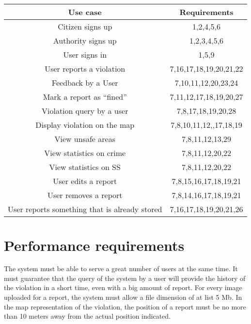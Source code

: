 \documentclass[../RASD.tex]{subfiles}
\begin{document}
    \begin{center}
        \begin{tabular}{ ||c||c|| }

            \hline
            \textbf{Use case} & \textbf{Requirements}  \\ \hline
            [\textbf{1}] Citizen signs up & 1,2,4,5,6 \\ \hline
            [\textbf{2}] Authority signs up & 1,2,3,4,5,6\\ \hline
            [\textbf{3}] User signs in & 1,5,9\\ \hline
            [\textbf{4}] User reports a violation & 7,16,17,18,19,20,21,22\\ \hline
            [\textbf{5}] Feedback by a User & 7,10,11,12,20,23,24\\ \hline
            [\textbf{6}] Mark a report as “fined” & 7,11,12,17,18,19,20,27\\ \hline
            [\textbf{7}] Violation query by a user & 7,8,17,18,19,20,28\\ \hline
            [\textbf{8}] Display violation on the map & 7,8,10,11,12,,17,18,19\\ \hline
            [\textbf{9}] View unsafe areas & 7,8,11,12,13,29\\ \hline
            [\textbf{10}] View statistics on crime & 7,8,11,12,20,22\\ \hline
            [\textbf{11}] View statistics on SS & 7,8,11,12,20,22\\ \hline
            [\textbf{12}] User edits a report & 7,8,15,16,17,18,19,21\\ \hline
            [\textbf{13}] User removes a report & 7,8,14,16,17,18,19,21\\ \hline
            [\textbf{14}] User reports something that is already stored & 7,16,17,18,19,20,21,26\\ \hline
        \end{tabular}
    \end{center}
        \section{Performance requirements}\label{sec:performance-requirements}
    The system must be able to serve a great number of users at the same time. It must guarantee that the query of the system by a user will provide the history of the violation in a short time, even with a big amount of report. For every image uploaded for a report, the system must allow a file dimension of at list 5 Mb. In the map representation of the violation, the position of a report must be no more than 10 meters away from the actual position indicated.
\end{document}

